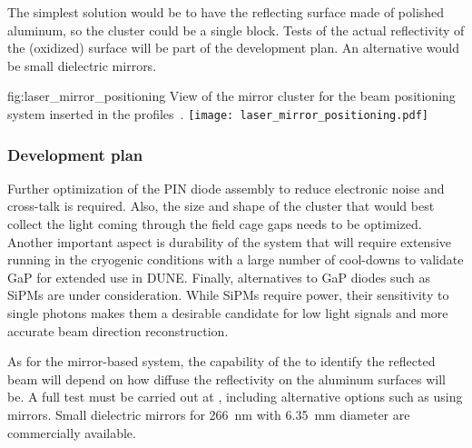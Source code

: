 The simplest solution would be to have the reflecting surface made of polished aluminum, so the cluster could be a single block. Tests of the actual reflectivity of the (oxidized) surface will be part of the development plan. An alternative would be small dielectric mirrors.

\begin{dunefigure}{fig:laser_mirror_positioning}
{View of the mirror cluster for the beam positioning system inserted in the  profiles~\cite{bib:yu2019a}.}
\texttt{[image: laser\_mirror\_positioning.pdf]}
\end{dunefigure}

\subsubsection{Development plan}

Further optimization of the PIN diode %
 assembly to reduce electronic noise and cross-talk is required. Also, the size and shape of the cluster that would best collect the light coming through the field cage gaps needs to be optimized.  Another important aspect is durability of the system that will require extensive running in the cryogenic conditions with  a large number of cool-downs to validate GaP for extended use in DUNE. Finally, alternatives to GaP diodes such as SiPMs are under consideration. While SiPMs require power, their sensitivity to single photons makes them a desirable candidate for low light signals and more accurate beam direction reconstruction. 

As for the mirror-based system, the capability of the  to identify the reflected beam will depend on how diffuse the reflectivity on the aluminum surfaces will be. A full test must be carried out at , including alternative options such as using mirrors. Small dielectric mirrors for \SI{266}{\nano\m} with \SI{6.35}{\milli\m} diameter are commercially available.

















